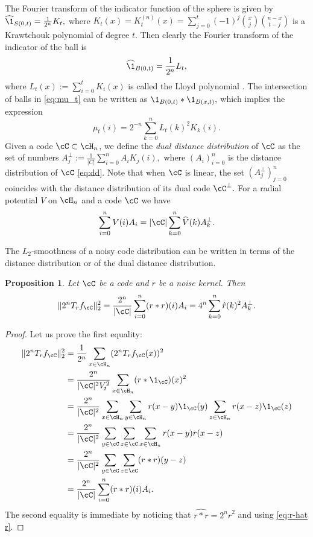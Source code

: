 \documentclass{amsart}
\newtheorem{proposition}[theorem]{Proposition}
\theoremstyle{remark}
\begin{document}
The Fourier transform of the indicator function of the sphere is given by $\widehat\1_{S(0,t)}=\frac1{2^n}K_t,$ where
$K_t(x)= {K}_t^{(n)}(x) = \sum_{j=0}^t(-1)^j\binom{x}{j}\binom{n-x}{t-j}$ is a Krawtchouk polynomial of degree $t$. Then clearly
the Fourier transform of the indicator of the ball is
\begin{equation}\label{eq: ft ball}
    \widehat\1_{B(0,t)}  =  \frac{1}{2^n}L_t,
\end{equation}
where $L_t(x):=\sum_{i=0}^t K_i(x)$ is called the Lloyd polynomial \cite[p.64]{delsarte1973an}. The intersection of balls in \eqref{eq:mu_t} can be written as $\1_{B(0,t)}\ast\1_{B(x,t)},$ which implies the expression \cite[Lemma~4.1]{barg2021stolarsky}
   \begin{equation}\label{eq:mu_tF}
   \mu_t(i)=2^{-n}\sum_{k=0}^n L_t(k)^2 K_k(i).
   \end{equation}
Given a code $\cC\subset \cH_n$, we define the {\em dual distance distribution} of $\cC$ 
as the set of numbers $A^\bot_j:=\frac{1}{|C|}\sum_{i=0}^n A_i K_j(i),$ where $(A_i)_{i=0}^n$ is the distance distribution of $\cC$ \eqref{eq:dd}. Note that when $\cC$ is linear, the set
$(A^\bot_j)_{j=0}^n$ coincides with the distance distribution of its dual code $\cC^\bot.$
For a radial potential $V$ on $\cH_n$ and a code $\cC$ we have
    \begin{align}\label{eq:r-hat r}
        \sum_{i=0}^nV(i)A_i = |\cC|\sum_{k=0}^n\widehat{V}(k)A_k^{\bot}.
    \end{align}

The $ L_2$-smoothness of a noisy code distribution can be written in terms of the distance distribution or of the dual distance distribution.
\begin{proposition}\label{prop: L2-smth}
Let $\cC$ be a code and $r$ be a noise kernel. Then
\begin{align*}
    \|2^nT_rf_{\cC}\|_2^2 = \frac{2^n}{|\cC|}\sum_{i=0}^n (r \ast r)(i)A_i = 4^n\sum_{k=0}^n\hat{r}(k)^2A_k^\bot.
\end{align*}

\end{proposition}

\begin{proof}
Let us prove the first equality:
    \begin{align}
    \|2^nT_rf_{\cC}\|_2^2 &= \frac{1}{2^n}\sum_{x\in \cH_n}(2^nT_rf_{\cC}(x))^2\nonumber\\
    &= \frac{2^n}{|\cC|^2V_t^2}\sum_{x\in \cH_n}(r\ast \1_{\cC})(x)^2\nonumber\\
    &= \frac{2^n}{|\cC|^2}\sum_{x\in \cH_n}\sum_{y\in \cH_n}r(x-y) \1_{\cC}(y)\sum_{z\in \cH_n}r(x-z)\1_{\cC}(z)\nonumber\\
    &= \frac{2^n}{|\cC|^2}\sum_{y\in \cC} \sum_{z\in \cC}\sum_{x\in \cH_n}r(x-y)r(x-z)\nonumber\\
    &= \frac{2^n}{|\cC|^2}\sum_{y\in \cC} \sum_{z\in \cC}(r\ast r)(y-z)\nonumber\\
    &= \frac{2^n}{|\cC|}\sum_{i=0}^n (r \ast r)(i)A_i.  
\end{align}
The second equality is immediate by noticing that $\widehat{r\ast r} = 2^n \hat{r}^2$ and using \eqref{eq:r-hat r}.
\end{proof}
\end{document}
